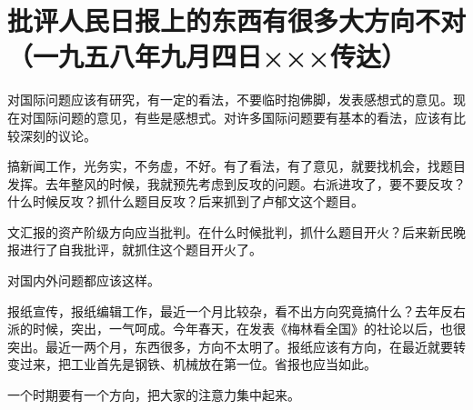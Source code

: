 \section[批评人民日报上的东西有很多大方向不对（一九五八年九月四日×××传达）]{批评人民日报上的东西有很多大方向不对（一九五八年九月四日×××传达）}


对国际问题应该有研究，有一定的看法，不要临时抱佛脚，发表感想式的意见。现在对国际问题的意见，有些是感想式。对许多国际问题要有基本的看法，应该有比较深刻的议论。

搞新闻工作，光务实，不务虚，不好。有了看法，有了意见，就要找机会，找题目发挥。去年整风的时候，我就预先考虑到反攻的问题。右派进攻了，要不要反攻？什么时候反攻？抓什么题目反攻？后来抓到了卢郁文这个题目。

文汇报的资产阶级方向应当批判。在什么时候批判，抓什么题目开火？后来新民晚报进行了自我批评，就抓住这个题目开火了。

对国内外问题都应该这样。

报纸宣传，报纸编辑工作，最近一个月比较杂，看不出方向究竟搞什么？去年反右派的时候，突出，一气呵成。今年春天，在发表《梅林看全国》的社论以后，也很突出。最近一两个月，东西很多，方向不太明了。报纸应该有方向，在最近就要转变过来，把工业首先是钢铁、机械放在第一位。省报也应当如此。

一个时期要有一个方向，把大家的注意力集中起来。


